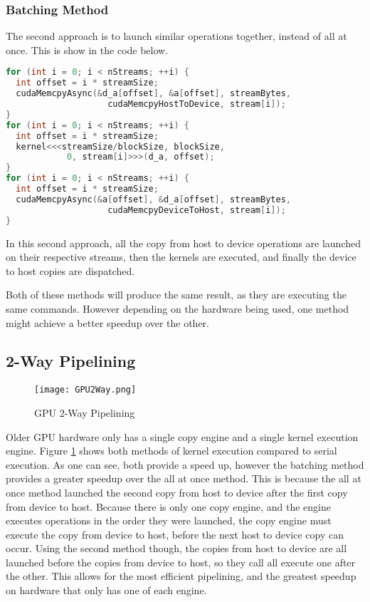 \subsubsection{Batching Method}
The second approach is to launch similar operations together, instead of all at once. This is show in the code below.
\begin{lstlisting}[language=C++,caption={Operations batched}]
for (int i = 0; i < nStreams; ++i) {
  int offset = i * streamSize;
  cudaMemcpyAsync(&d_a[offset], &a[offset], streamBytes, 
                    cudaMemcpyHostToDevice, stream[i]);
}
for (int i = 0; i < nStreams; ++i) {
  int offset = i * streamSize;
  kernel<<<streamSize/blockSize, blockSize, 
            0, stream[i]>>>(d_a, offset);
}
for (int i = 0; i < nStreams; ++i) {
  int offset = i * streamSize;
  cudaMemcpyAsync(&a[offset], &d_a[offset], streamBytes, 
                    cudaMemcpyDeviceToHost, stream[i]);
}
\end{lstlisting}
In this second approach, all the copy from host to device operations are launched on their respective streams, then the kernels are executed, and finally the device to host copies are dispatched.

Both of these methods will produce the same result, as they are executing the same commands. However depending on the hardware being used, one method might achieve a better speedup over the other.

\subsection{2-Way Pipelining}
\begin{figure}[htp]
\centering
\texttt{[image: GPU2Way.png]}
\caption{GPU 2-Way Pipelining}
\label{fig:GPU2Way}
\end{figure}
Older GPU hardware only has a single copy engine and a single kernel execution engine. Figure \ref{fig:GPU2Way} shows both methods of kernel execution compared to serial execution. As one can see, both provide a speed up, however the batching method provides a greater speedup over the all at once method. This is because the all at once method launched the second copy from host to device after the first copy from device to host. Because there is only one copy engine, and the engine executes operations in the order they were launched, the copy engine must execute the copy from device to host, before the next host to device copy can occur. Using the second method though, the copies from host to device are all launched before the copies from device to host, so they call all execute one after the other. This allows for the most efficient pipelining, and the greatest speedup on hardware that only has one of each engine.
